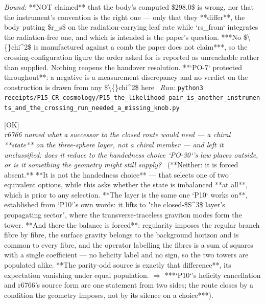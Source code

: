 \begin{description}
 \emph{Bound:}  **NOT claimed** that the body's computed \$298.0\$ is wrong, nor that the instrument's convention is the right one --- only that they **differ**, the body putting \$r\_s\$ on the radiation-carrying leaf rate while `rs\_from` integrates the radiation-free one, and which is intended is the paper's question. ***No \$\textbackslash\{\}chi\textasciicircum{}2\$ is manufactured against a comb the paper does not claim***, so the crossing-configuration figure the order asked for is reported as unreachable rather than supplied. Nothing reopens the handover resolution. **`PO-7` protected throughout**: a negative is a measurement discrepancy and no verdict on the construction is drawn from any \$\textbackslash\{\}chi\textasciicircum{}2\$ here
\ \emph{Run:} \texttt{python3 receipts/P15\_CR\_cosmology/P15\_the\_likelihood\_pair\_is\_another\_instruments\_and\_the\_crossing\_run\_needed\_a\_missing\_knob.py}
\item[\rcptlabel{P15_the_chiral_state_the_route_needs_is_forced_absent_not_merely_unchosen}{P15R154}\textbf{P15R154}\quad\texttt{P15\_the\_chiral\_state\_the\_route\_needs\_is\_forced\_absent\_not\_merely\_unchosen}]\hfill\textsf{[OK]}\\
\textit{r6766 named what a successor to the closed route would need --- a chiral **state** on the three-sphere layer, not a chiral member --- and left it unclassified: does it reduce to the handedness choice `PO-30`'s law places outside, or is it something the geometry might still supply?} \ (**Neither: it is forced absent.**  **It is not the handedness choice** --- that selects one of two equivalent options, while this asks whether the state is imbalanced **at all**, which is prior to any selection.  **The layer is the same one `P10` works on**, established from `P10`'s own words: it lifts to "the closed-\$S\textasciicircum{}3\$ layer's propagating sector", where the transverse-traceless graviton modes form the tower.  **And there the balance is forced**: regularity imposes the regular branch fibre by fibre, the surface gravity belongs to the background horizon and is common to every fibre, and the operator labelling the fibres is a sum of squares with a single coefficient --- no helicity label and no sign, so the two towers are populated alike.  **The parity-odd source is exactly that difference**, its expectation vanishing under equal population. \ensuremath{\Rightarrow} ***`P10`'s helicity cancellation and r6766's source form are one statement from two sides; the route closes by a condition the geometry imposes, not by its silence on a choice***). 

\end{description}
